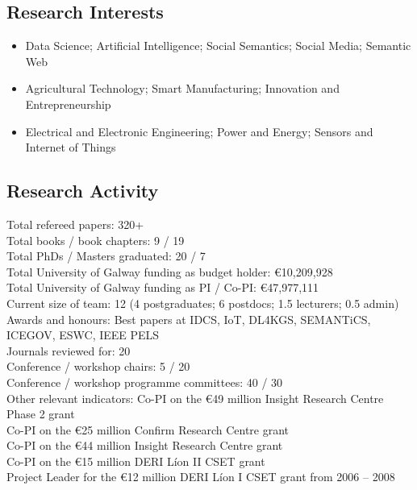 \documentclass[10pt,a4paper]{res} %
\begin{document}
\begin{resume}
\subsection*{Research Interests}

\begin{itemize} \itemsep -2pt
\item Data Science; Artificial Intelligence; Social Semantics; Social Media; Semantic Web
\item Agricultural Technology; Smart Manufacturing; Innovation and Entrepreneurship
\item Electrical and Electronic Engineering; Power and Energy; Sensors and Internet of Things
\end{itemize}

\subsection*{Research Activity}

\begin{center}
Total refereed papers: \hfill 320+ \\ %
Total books / book chapters: \hfill 9 / 19 \\ %
Total PhDs / Masters graduated: \hfill 20 / 7 \\ %
Total University of Galway funding as budget holder: \hfill \euro{}10,209,928 \\
Total University of Galway funding as PI / Co-PI: \hfill \euro{}47,977,111 \\
Current size of team: \hfill 12 (4 postgraduates; 6 postdocs; 1.5 lecturers; 0.5 admin) \\
Awards and honours: \hfill Best papers at IDCS, IoT, DL4KGS, SEMANTiCS, ICEGOV, ESWC, IEEE PELS \\
Journals reviewed for: \hfill 20 \\
Conference / workshop chairs: \hfill 5 / 20 \\
Conference / workshop programme committees: \hfill 40 / 30 \\
Other relevant indicators: \hfill Co-PI on the \euro{}49 million Insight Research Centre Phase 2 grant \\ \hfill Co-PI on the \euro{}25 million Confirm Research Centre grant \\ \hfill Co-PI on the \euro{}44 million Insight Research Centre grant \\ \hfill Co-PI on the \euro{}15 million DERI L\'{i}on II CSET grant \\ \hfill Project Leader for the \euro{}12 million DERI L\'{i}on I CSET grant from 2006 -- 2008
\end{center}


\end{resume}
\end{document}
